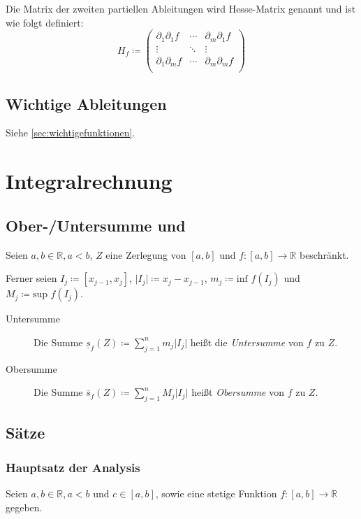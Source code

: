 	Die Matrix der zweiten partiellen Ableitungen wird Hesse-Matrix genannt und ist wie folgt definiert:
	\begin{equation*}
		H _ f \coloneqq
		\begin{pmatrix}
			\partial _ 1 \partial _ 1 f & \cdots & \partial _ m \partial _ 1 f \\
			\vdots                      & \ddots & \vdots                      \\
			\partial _ 1 \partial _ m f & \cdots & \partial _ m \partial _ m f \\
		\end{pmatrix}
	\end{equation*}

\section{Wichtige Ableitungen}
	Siehe \ref{sec:wichtigefunktionen}.

\chapter{Integralrechnung}
	\section{Ober-/Untersumme und}
		Seien $ a, b \in \mathbb{R}, a < b $, $ Z $ eine Zerlegung von $ [a, b] $ und $ f : [a, b] \rightarrow \mathbb{R} $ beschränkt.

		Ferner seien $ I _ j \coloneqq [x _ { j - 1 }, x _ j] $, $ \lvert I _ j \rvert \coloneqq x _ j - x _ { j - 1 } $, $ m _ j \coloneqq \text{inf } f(I _ j) $ und $ M _ j \coloneqq \text{sup } f(I _ j) $.

		\begin{description}
			\item[Untersumme] Die Summe $ \underline{s} _ f (Z) \coloneqq \sum _ { j = 1 } ^ n m _ j \lvert I _ j \rvert $ heißt die \textit{Untersumme} von $ f $ zu $ Z $.
			\item[Obersumme] Die Summe $ \overline{s} _ f (Z) \coloneqq \sum _ { j = 1 } ^ n M _ j \lvert I _ j \rvert $ heißt \textit{Obersumme} von $ f $ zu $ Z $.
		\end{description}

	\section{Sätze}
		\subsection{Hauptsatz der Analysis}
			Seien $ a, b \in \mathbb{R}, a < b $ und $ c \in [a, b] $, sowie eine stetige Funktion $ f : [a, b] \rightarrow \mathbb{R} $ gegeben.

